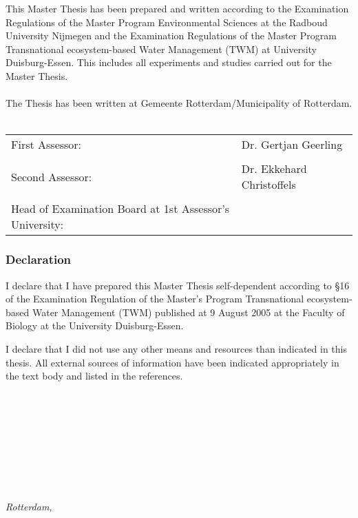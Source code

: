 \newpage
This Master Thesis has been prepared and written according to the Examination Regulations of the Master Program Environmental Sciences at the Radboud University Nijmegen and the Examination Regulations of the Master Program Transnational ecosystem-based Water Management (TWM) at University Duisburg-Essen. This includes all experiments and studies carried out for the Master Thesis. \\
\\
The Thesis has been written at Gemeente Rotterdam/Municipality of Rotterdam. \\
\\

\begin{tabular}{ll}
    First Assessor: & Dr. Gertjan Geerling\\
    \\
    Second Assessor: & Dr. Ekkehard Christoffels \\
    \\
    Head of Examination Board at 1st Assessor's University: &                     \\
\end{tabular}
\newpage
\subsubsection{Declaration}
I declare that I have prepared this Master Thesis self-dependent according to §16 of the Examination Regulation of the Master's Program Transnational ecosystem-based Water Management (TWM) published at 9 August 2005 at the Faculty of Biology at the University Duisburg-Essen. 

I declare that I did not use any other means and resources than indicated in this thesis. All external sources of information have been indicated appropriately in the text body and listed in the references. \\
\\
\\
\\
\\
\\
\\
\\
\begin{flushright}
{\makeatletter\itshape
    \@author \\
    Rotterdam, \monthname{} \the\year{}
\makeatother}
\end{flushright}








